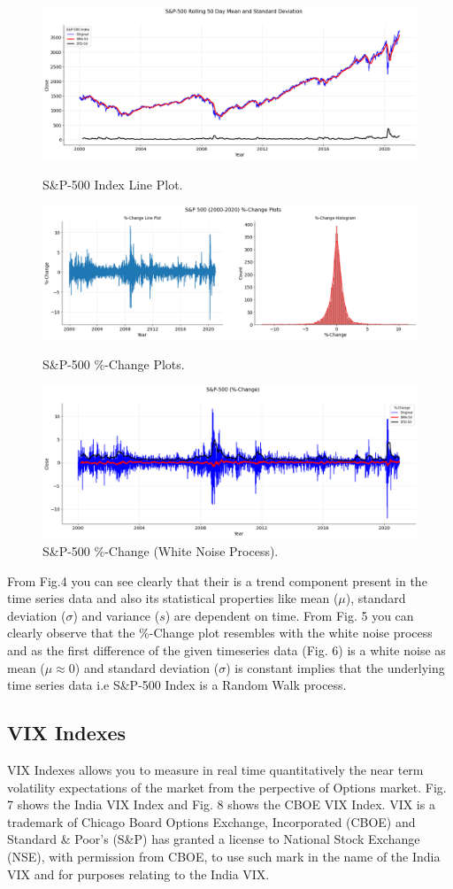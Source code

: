 \documentclass[conference]{IEEEtran}
\begin{document}
\begin{figure}[htbp]
	\centering
	\includegraphics[width = 0.52 \textwidth]{images/S and P-500 Line Plot.png}
	\caption{S\&P-500 Index Line Plot.}
	\includegraphics[width = 0.51 \textwidth]{images/S&P-500 Change Plot.png}
	\caption{S\&P-500 \%-Change Plots.}
	\includegraphics[width = 0.51 \textwidth]{images/S&P-500 White Noise Part.png}
	\caption{S\&P-500 \%-Change (White Noise Process).}
\end{figure}
From Fig.4 you can see clearly that their is a  trend component present in the time series data and also its statistical properties like mean ($\mu$), standard deviation ($\sigma$) and variance ($s$) are dependent on time.
From Fig. 5 you can clearly observe that the \%-Change plot resembles with the white noise process and as the first difference of the given timeseries data (Fig. 6) is a white noise as mean ($\mu \approx 0$) and standard deviation ($\sigma$) is constant implies that the underlying time series data i.e S\&P-500 Index is a Random Walk process.

\subsection{VIX Indexes}
VIX Indexes allows you to measure in real time quantitatively the near term volatility expectations of the market from the perpective of Options market. Fig. 7 shows the India VIX Index and Fig. 8 shows the CBOE VIX Index.
VIX is a trademark of Chicago Board Options Exchange, Incorporated (CBOE) and Standard \& Poor's (S\&P) has granted a license to National Stock Exchange (NSE), with permission from CBOE, to use such mark in the name of the India VIX and for purposes relating to the India VIX.
\end{document}
